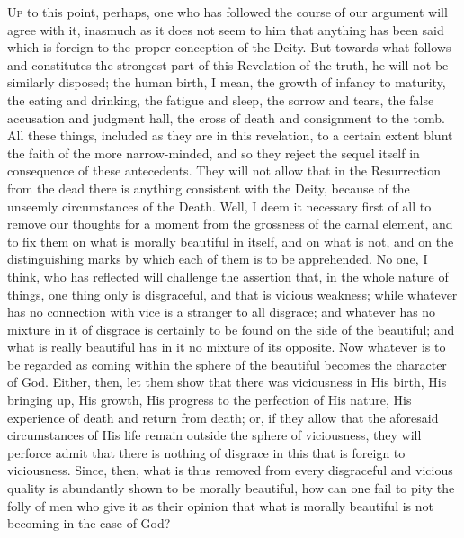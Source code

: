 \textsc{Up} to this point, perhaps, one who has followed the course of our argument will agree with it, inasmuch as it does not seem to him that anything has been said which is foreign to the proper conception of the Deity. But towards what follows and constitutes the strongest part of this Revelation of the truth, he will not be similarly disposed; the human birth, I mean, the growth of infancy to maturity, the eating and drinking, the fatigue and sleep, the sorrow and tears, the false accusation and judgment hall, the cross of death and consignment to the tomb. All these things, included as they are in this revelation, to a certain extent blunt the faith of the more narrow-minded, and so they reject the sequel itself in consequence of these antecedents. They will not allow that in the Resurrection from the dead there is anything consistent with the Deity, because of the unseemly circumstances of the Death. Well, I deem it necessary first of all to remove our thoughts for a moment from the grossness of the carnal element, and to fix them on what is morally beautiful in itself, and on what is not, and on the distinguishing marks by which each of them is to be apprehended. No one, I think, who has reflected will challenge the assertion that, in the whole nature of things, one thing only is disgraceful, and that is vicious weakness; while whatever has no connection with vice is a stranger to all disgrace; and whatever has no mixture in it of disgrace is certainly to be found on the side of the beautiful; and what is really beautiful has in it no mixture of its opposite. Now whatever is to be regarded as coming within the sphere of the beautiful becomes the character of God. Either, then, let them show that there was viciousness in His birth, His bringing up, His growth, His progress to the perfection of His nature, His experience of death and return from death; or, if they allow that the aforesaid circumstances of His life remain outside the sphere of viciousness, they will perforce admit that there is nothing of disgrace in this that is foreign to viciousness. Since, then, what is thus removed from every disgraceful and vicious quality is abundantly shown to be morally beautiful, how can one fail to pity the folly of men who give it as their opinion that what is morally beautiful is not becoming in the case of God?


